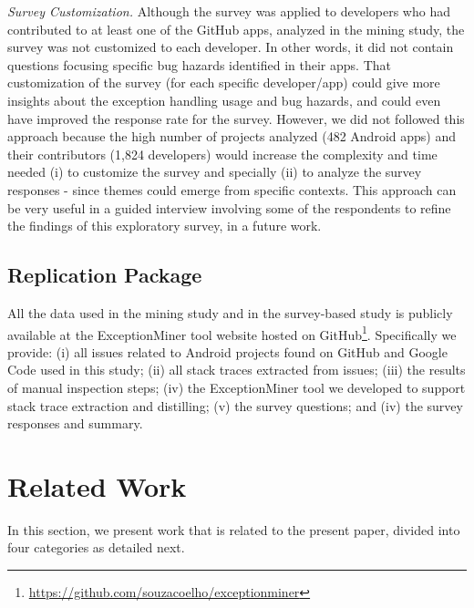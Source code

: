 {\emph{Survey Customization.} Although the survey was applied to developers who had contributed to at least one of the GitHub apps, analyzed in the mining study, the survey was not customized to each developer. In other words, it did not contain questions focusing specific bug hazards identified in their apps. That customization of the survey (for each specific developer/app) could give more insights about the exception handling usage and bug hazards, and could even have improved the response rate for the survey. However, we did not followed this approach because the high number of projects analyzed (482 Android apps) and their contributors (1,824 developers) would increase the complexity and time needed (i) to customize the survey and specially (ii) to analyze the survey responses - since themes could emerge from specific contexts. This approach can be very useful in a guided interview involving some of the respondents to refine the findings of this exploratory survey, in a future work.





\subsection{Replication Package}
All the data used in the mining study and in the survey-based study is publicly
available at the ExceptionMiner tool website hosted on GitHub\footnote{\url{https://github.com/souzacoelho/exceptionminer}}.
Specifically we provide: (i) all issues related to Android projects found
on GitHub and Google Code used in this study; (ii) all stack traces extracted
from issues; (iii) the results of manual inspection steps; (iv) the
ExceptionMiner tool we developed to support stack trace extraction and distilling;
(v) the survey questions; and (iv) the survey responses and summary.

\section{Related Work}
\label{sec:rele}

In this section, we present work that is related to the present paper, divided into
four categories as detailed next.

}
